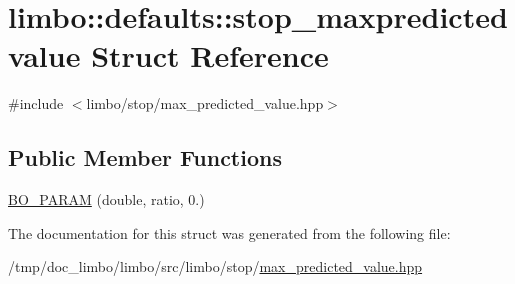 \hypertarget{structlimbo_1_1defaults_1_1stop__maxpredictedvalue}{}\section{limbo\+:\+:defaults\+:\+:stop\+\_\+maxpredictedvalue Struct Reference}
\label{structlimbo_1_1defaults_1_1stop__maxpredictedvalue}


{\ttfamily \#include $<$limbo/stop/max\+\_\+predicted\+\_\+value.\+hpp$>$}

\subsection*{Public Member Functions}
\begin{DoxyCompactItemize}
\item 
\hyperlink{group__stop__defaults_ga65d82b10cd35e92f2df32c2dbed0f91b}{B\+O\+\_\+\+P\+A\+R\+A\+M} (double, ratio, 0.)
\end{DoxyCompactItemize}


The documentation for this struct was generated from the following file\+:\begin{DoxyCompactItemize}
\item 
/tmp/doc\+\_\+limbo/limbo/src/limbo/stop/\hyperlink{max__predicted__value_8hpp}{max\+\_\+predicted\+\_\+value.\+hpp}\end{DoxyCompactItemize}
